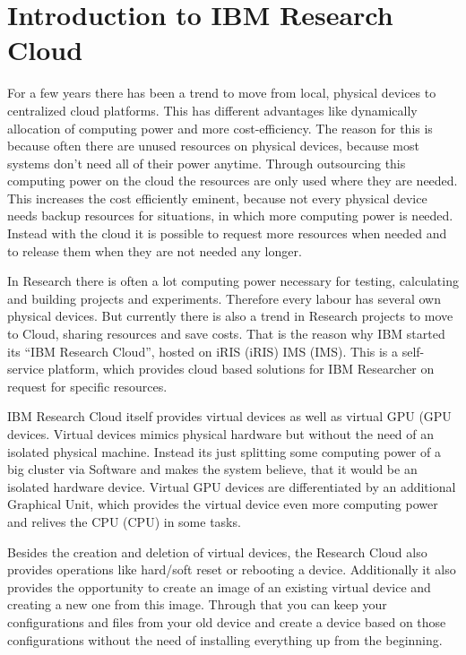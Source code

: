 
\section{Introduction to IBM Research Cloud}

For a few years there has been a trend to move from local, physical devices to centralized cloud platforms. This has different advantages like dynamically allocation of computing power and more cost-efficiency. The reason for this is because often there are unused resources on physical devices, because most systems don't need all of their power anytime. Through outsourcing this computing power on the cloud the resources are only used where they are needed. This increases the cost efficiently eminent, because not every physical device needs backup resources for situations, in which more computing power is needed. Instead with the cloud it is possible to request more resources when needed and to release them when they are not needed any longer.

In Research there is often a lot computing power necessary for testing, calculating and building projects and experiments. Therefore every labour has several own physical devices. But currently there is also a trend in Research projects to move to Cloud, sharing resources and save costs. That is the reason why IBM started its ``IBM Research Cloud'', hosted on \acs{iRIS} (\acl{iRIS}) \acs{IMS} (\acl{IMS}). This is a self-service platform, which provides cloud based solutions for IBM Researcher on request for specific resources.


IBM Research Cloud itself provides virtual devices as well as virtual \acs{GPU} (\acl{GPU} devices. Virtual devices mimics physical hardware but without the need of an isolated physical machine. Instead its just splitting some computing power of a big cluster via Software and makes the system believe, that it would be an isolated hardware device. Virtual GPU devices are differentiated by an additional Graphical Unit, which provides the virtual device even more computing power and relives the \acs{CPU} (\acl{CPU}) in some tasks.


Besides the creation and deletion of virtual devices, the Research Cloud also provides operations like hard/soft reset or rebooting a device. Additionally it also provides the opportunity to create an image of an existing virtual device and creating a new one from this image. Through that you can keep your configurations and files from your old device and create a device based on those configurations without the need of installing everything up from the beginning.

